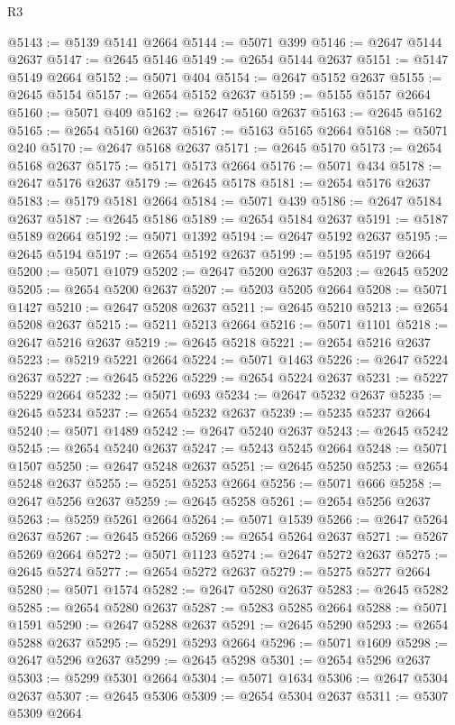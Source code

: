 \begin{lexlean}{R3}
\begin{coremodule}
@5143 := @5139 @5141 @2664
@5144 := @5071 @399
@5146 := @2647 @5144 @2637
@5147 := @2645 @5146
@5149 := @2654 @5144 @2637
@5151 := @5147 @5149 @2664
@5152 := @5071 @404
@5154 := @2647 @5152 @2637
@5155 := @2645 @5154
@5157 := @2654 @5152 @2637
@5159 := @5155 @5157 @2664
@5160 := @5071 @409
@5162 := @2647 @5160 @2637
@5163 := @2645 @5162
@5165 := @2654 @5160 @2637
@5167 := @5163 @5165 @2664
@5168 := @5071 @240
@5170 := @2647 @5168 @2637
@5171 := @2645 @5170
@5173 := @2654 @5168 @2637
@5175 := @5171 @5173 @2664
@5176 := @5071 @434
@5178 := @2647 @5176 @2637
@5179 := @2645 @5178
@5181 := @2654 @5176 @2637
@5183 := @5179 @5181 @2664
@5184 := @5071 @439
@5186 := @2647 @5184 @2637
@5187 := @2645 @5186
@5189 := @2654 @5184 @2637
@5191 := @5187 @5189 @2664
@5192 := @5071 @1392
@5194 := @2647 @5192 @2637
@5195 := @2645 @5194
@5197 := @2654 @5192 @2637
@5199 := @5195 @5197 @2664
@5200 := @5071 @1079
@5202 := @2647 @5200 @2637
@5203 := @2645 @5202
@5205 := @2654 @5200 @2637
@5207 := @5203 @5205 @2664
@5208 := @5071 @1427
@5210 := @2647 @5208 @2637
@5211 := @2645 @5210
@5213 := @2654 @5208 @2637
@5215 := @5211 @5213 @2664
@5216 := @5071 @1101
@5218 := @2647 @5216 @2637
@5219 := @2645 @5218
@5221 := @2654 @5216 @2637
@5223 := @5219 @5221 @2664
@5224 := @5071 @1463
@5226 := @2647 @5224 @2637
@5227 := @2645 @5226
@5229 := @2654 @5224 @2637
@5231 := @5227 @5229 @2664
@5232 := @5071 @693
@5234 := @2647 @5232 @2637
@5235 := @2645 @5234
@5237 := @2654 @5232 @2637
@5239 := @5235 @5237 @2664
@5240 := @5071 @1489
@5242 := @2647 @5240 @2637
@5243 := @2645 @5242
@5245 := @2654 @5240 @2637
@5247 := @5243 @5245 @2664
@5248 := @5071 @1507
@5250 := @2647 @5248 @2637
@5251 := @2645 @5250
@5253 := @2654 @5248 @2637
@5255 := @5251 @5253 @2664
@5256 := @5071 @666
@5258 := @2647 @5256 @2637
@5259 := @2645 @5258
@5261 := @2654 @5256 @2637
@5263 := @5259 @5261 @2664
@5264 := @5071 @1539
@5266 := @2647 @5264 @2637
@5267 := @2645 @5266
@5269 := @2654 @5264 @2637
@5271 := @5267 @5269 @2664
@5272 := @5071 @1123
@5274 := @2647 @5272 @2637
@5275 := @2645 @5274
@5277 := @2654 @5272 @2637
@5279 := @5275 @5277 @2664
@5280 := @5071 @1574
@5282 := @2647 @5280 @2637
@5283 := @2645 @5282
@5285 := @2654 @5280 @2637
@5287 := @5283 @5285 @2664
@5288 := @5071 @1591
@5290 := @2647 @5288 @2637
@5291 := @2645 @5290
@5293 := @2654 @5288 @2637
@5295 := @5291 @5293 @2664
@5296 := @5071 @1609
@5298 := @2647 @5296 @2637
@5299 := @2645 @5298
@5301 := @2654 @5296 @2637
@5303 := @5299 @5301 @2664
@5304 := @5071 @1634
@5306 := @2647 @5304 @2637
@5307 := @2645 @5306
@5309 := @2654 @5304 @2637
@5311 := @5307 @5309 @2664

\end{coremodule}
\end{lexlean}
